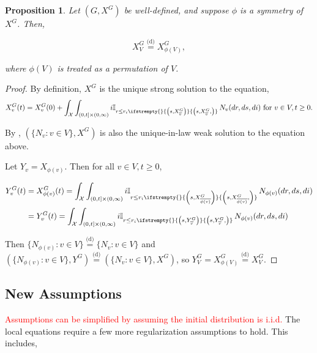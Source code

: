 \documentclass[12pt]{article}
\newcommand{\mb}{\mathbb}
\newcommand{\mc}{\mathcal}
\newcommand{\ov}{\overline}
\newcommand{\te}{\text}
\newcommand{\tr}{\textcolor{red}}
\newcommand{\ind}{\hspace{24pt}}
\newcommand{\deq}{\overset{\text{(d)}}{=}}			%
\newcommand{\sta}{\mc{X}}							%
\newcommand{\cl}[1]{\ov{#1}}						%
\newcommand{\Xf}{X}									%
\newcommand{\poiss}{N}								%
\newcommand{\rate}{r}								%
\newcommand{\poissv}[1]{_{#1}}						%
\newcommand{\vind}[1]{_{#1}}						%
\newcommand{\tme}[1]{(#1)}							%
\newcommand{\gind}[1]{^{#1}}						%
\newcommand{\stpara}[1]{_{#1}}						%
\newcommand{\tmepro}[3]{
\ifstrempty{#3}{
	\left(#1,#2\right)}{
	\left(#1,#2,#3\right)}}							%
\newcommand{\Xg}{Y}									%
\newtheorem{prop}[thms]{Proposition}
\begin{document}
\begin{prop}
Let \((G,\Xf\gind{G})\) be well-defined, and suppose \(\phi\) is a symmetry of \(\Xf\gind{G}\). Then,

\[\Xf\gind{G}\vind{V} \deq \Xf\gind{G}\vind{\phi(V)},\]

where \(\phi(V)\) is treated as a permutation of \(V\).
\label{a::simprop}
\end{prop}
\begin{proof}
By definition, \(\Xf\gind{G}\) is the unique strong solution to the equation,
\[\Xf\gind{G}\vind{v}\tme{t} = \Xf\gind{G}\vind{v}\tme{0} + \int_\sta\int_{(0,t]\times(0,\infty)} i\mb{I}_{r \leq \rate\stpara{i}\tmepro{s}{\Xf\gind{G}\vind{\cl{v}}}{}}\,\poiss\poissv{v}(dr,ds,di) \te{ for } v \in V, t \geq 0.\]

By \cite[Proposition 2.10]{Kur07}, \((\{\poiss\poissv{v}:v\in V\},\Xf\gind{G})\) is also the unique-in-law weak solution to the equation above.

\ind Let \(\Xg\vind{v} = \Xf\vind{\phi(v)}\). Then for all \(v\in V,t\geq 0\),

\begin{align*}
\Xg\gind{G}\vind{v}\tme{t} &= \Xf\gind{G}\vind{\phi(v)}\tme{t} = \int_\sta\int_{(0,t]\times(0,\infty)} i\mb{I}_{r \leq \rate\stpara{i}\tmepro{s}{\Xf\gind{G}\vind{\cl{\phi(v)}}}{}}\,\poiss\poissv{\phi(v)}(dr,ds,di)\\
&= \Xg\gind{G}\vind{v}\tme{t} = \int_\sta\int_{(0,t]\times(0,\infty)} i\mb{I}_{r \leq \rate\stpara{i}\tmepro{s}{\Xg\gind{G}\vind{\cl{v}}}{}}\,\poiss\poissv{\phi(v)}(dr,ds,di)\\
\end{align*}

Then \(\{\poiss\poissv{\phi(v)}:v \in V\} \deq \{\poiss\poissv{v}:v\in V\}\) and \((\{\poiss\poissv{\phi(v)}:v \in V\},\Xg\gind{G}) \deq (\{\poiss\poissv{v}:v \in V\},\Xf\gind{G})\), so \(\Xg\gind{G}\vind{V} = \Xf\gind{G}\vind{\phi(V)} \deq \Xf\gind{G}\vind{V}\).
\end{proof}



\subsection{New Assumptions}
\label{a::not}

\tr{Assumptions can be simplified by assuming the initial distribution is i.i.d.} The local equations require a few more regularization assumptions to hold. This includes,
\end{document}
